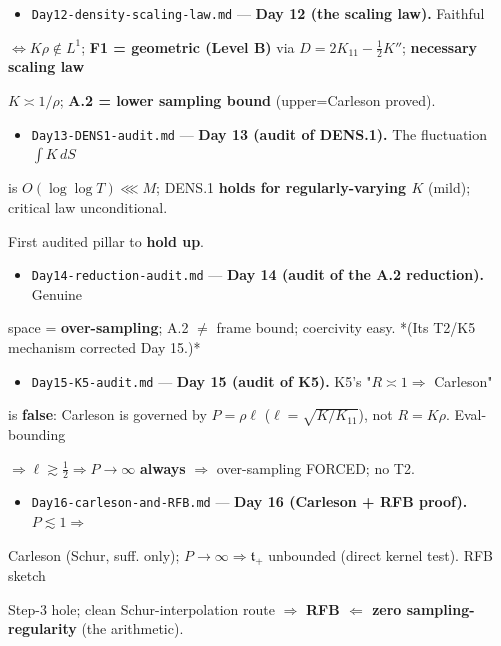 \documentclass[10pt]{article}
\begin{document}
\begin{itemize}
\item \texttt{Day12-density-scaling-law.md} --- \textbf{Day 12 (the scaling law).} Faithful
\end{itemize}
  $\iff K\rho\notin L^1$; \textbf{F1 = geometric (Level B)} via $D=2K_{11}-\tfrac12K''$; \textbf{necessary scaling law}\par
  $K\asymp1/\rho$; \textbf{A.2 = lower sampling bound} (upper=Carleson proved).\par
\begin{itemize}
\item \texttt{Day13-DENS1-audit.md} --- \textbf{Day 13 (audit of DENS.1).} The fluctuation $\int K\,dS$
\end{itemize}
  is $O(\log\log T)\lll M$; DENS.1 \textbf{holds for regularly-varying $K$} (mild); critical law unconditional.\par
  First audited pillar to \textbf{hold up}.\par
\begin{itemize}
\item \texttt{Day14-reduction-audit.md} --- \textbf{Day 14 (audit of the A.2 reduction).} Genuine
\end{itemize}
  space = \textbf{over-sampling}; A.2 \ensuremath{\ne} frame bound; coercivity easy. *(Its T2/K5 mechanism corrected Day 15.)*\par
\begin{itemize}
\item \texttt{Day15-K5-audit.md} --- \textbf{Day 15 (audit of K5).} K5's "$R\asymp1\Rightarrow$ Carleson"
\end{itemize}
  is \textbf{false}: Carleson is governed by $P=\rho\ell$ ($\ell=\sqrt{K/K_{11}}$), not $R=K\rho$. Eval-bounding\par
  $\Rightarrow\ell\gtrsim\tfrac12\Rightarrow P\to\infty$ \textbf{always} \ensuremath{\Rightarrow} over-sampling FORCED; no T2.\par
\begin{itemize}
\item \texttt{Day16-carleson-and-RFB.md} --- \textbf{Day 16 (Carleson + RFB proof).} $P\lesssim1\Rightarrow$
\end{itemize}
  Carleson (Schur, suff. only); $P\to\infty\Rightarrow\mathfrak t_+$ unbounded (direct kernel test). RFB sketch\par
  Step-3 hole; clean Schur-interpolation route \ensuremath{\Rightarrow} \textbf{RFB $\Leftarrow$ zero sampling-regularity} (the arithmetic).\par
\end{document}
